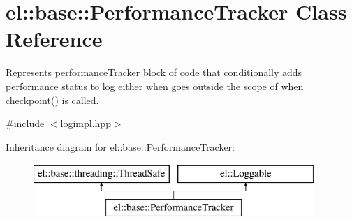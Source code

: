 \hypertarget{classel_1_1base_1_1PerformanceTracker}{\section{el\-:\-:base\-:\-:Performance\-Tracker Class Reference}
\label{classel_1_1base_1_1PerformanceTracker}
}


Represents performance\-Tracker block of code that conditionally adds performance status to log either when goes outside the scope of when \hyperlink{classel_1_1base_1_1PerformanceTracker_aec9a6e149674c5782cc855e49aeb0aaf}{checkpoint()} is called.  




{\ttfamily \#include $<$logimpl.\-hpp$>$}

Inheritance diagram for el\-:\-:base\-:\-:Performance\-Tracker\-:\begin{figure}[H]
\begin{center}
\leavevmode
\includegraphics[height=2.000000cm]{classel_1_1base_1_1PerformanceTracker}
\end{center}
\end{figure}
